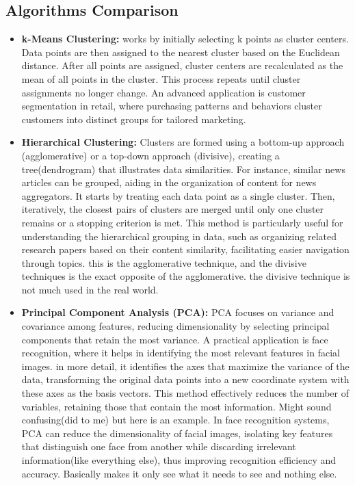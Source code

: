 \documentclass[11pt]{article}
\begin{document}
\subsection{Algorithms Comparison}
\begin{itemize}
    \item \textbf{k-Means Clustering:} works by initially selecting k points as cluster centers. Data points are then assigned to the nearest cluster based on the Euclidean distance. After all points are assigned, cluster centers are recalculated as the mean of all points in the cluster. This process repeats until cluster assignments no longer change. An advanced application is customer segmentation in retail, where purchasing patterns and behaviors cluster customers into distinct groups for tailored marketing.


\item \textbf{Hierarchical Clustering:} Clusters are formed using a bottom-up approach (agglomerative) or a top-down approach (divisive), creating a tree(dendrogram) that illustrates data similarities. For instance, similar news articles can be grouped, aiding in the organization of content for news aggregators. It starts by treating each data point as a single cluster. Then, iteratively, the closest pairs of clusters are merged until only one cluster remains or a stopping criterion is met. This method is particularly useful for understanding the hierarchical grouping in data, such as organizing related research papers based on their content similarity, facilitating easier navigation through topics. this is the agglomerative technique, and the divisive techniques is the exact opposite of the agglomerative. the divisive technique is not much used in the real world.

\item \textbf{Principal Component Analysis (PCA):} PCA focuses on variance and covariance among features, reducing dimensionality by selecting principal components that retain the most variance. A practical application is face recognition, where it helps in identifying the most relevant features in facial images. in more detail, it identifies the axes that maximize the variance of the data, transforming the original data points into a new coordinate system with these axes as the basis vectors. This method effectively reduces the number of variables, retaining those that contain the most information. Might sound confusing(did to me) but here is an example. In face recognition systems, PCA can reduce the dimensionality of facial images, isolating key features that distinguish one face from another while discarding irrelevant information(like everything else), thus improving recognition efficiency and accuracy.
Basically makes it only see what it needs to see and nothing else.
\end{itemize}
\end{document}
